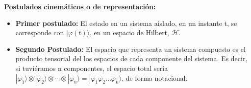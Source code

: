 \newpage
\textbf{Postulados cinemáticos o de representación:}
\begin{itemize}
    \item \textbf{Primer postulado:} El estado en un sistema aislado, en un instante t, se corresponde con $| \varphi (t) \rangle$, en un espacio de Hilbert, $\mathscr{H}$.
    
    \item \textbf{Segundo Postulado:} El espacio que representa un sistema compuesto es el producto tensorial del los espacios de cada componente del sistema. Es decir, si tuviéramos n componentes, el espacio total sería $|\varphi_{1}\rangle \otimes |\varphi_{2}\rangle \otimes \dotsi \otimes |\varphi_{n}\rangle = |\varphi_{1}\varphi_{2}\dotso \varphi_{n}\rangle$, de forma notacional.
\end{itemize}

